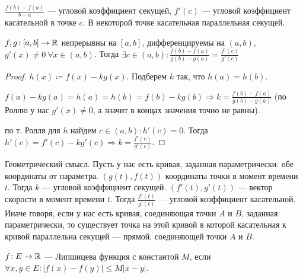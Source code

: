 \begin{remark}
    $\frac{f(b) - f(a)}{b - a}$ --- угловой коэффициент секущей, $f'(c)$ --- угловой коэффициент касательной в точке  $c$. В некоторой точке касательная параллельная секущей. 
\end{remark}
\begin{theorem}
    $f, g\!:[a, b] \to \mathbb{R}$ непрерывны на  $[a, b]$, дифференцируемы на  $(a, b)$,  $g'(x) \neq 0\ \forall x\in(a, b)$. Тогда $\exists c \in (a, b)\!: \frac{f(b) - f(a)}{g(b) - g(a)} = \frac{f'(c)}{g'(c)}$
\end{theorem}
\begin{proof}
    $h(x) \coloneqq f(x) - kg(x)$. Подберем $k$ так, что  $h(a) = h(b)$.

    $f(a) - kg(a) = h(a) = h(b) = f(b) - kg(b) \Rightarrow k = \frac{f(b) - f(a)}{g(b) - g(a)}$ (по Роллю у нас $g'(x) \neq 0$, а значит в концах значения точно не равны).

    по т. Ролля для $h$ найдем  $c \in (a, b)\!: h'(c) = 0$. Тогда  $h'(c) = f'(c) - kg'(c) \Rightarrow k = \frac{f'(c)}{g'(c)}$.
\end{proof}
\begin{remark}
	Геометрический смысл. Пусть у нас есть кривая, заданная параметрически: обе координаты от параметра. $(g(t), f(t))$ координаты точки в момент времени $t$. Тогда  $k$ --- угловой коэффициент секущей. $(f'(t), g'(t))$ --- вектор скорости в момент времени $t$. Тогда $\frac{f'(t)}{g'(t)}$ --- угловой коэффициент касательной. Иначе говоря, если у нас есть кривая, соединяющая точки $A$ и $B$, заданная параметрически, то существует точка на этой кривой в которой касательная к кривой параллельна секущей --- прямой, соединяющей точки $A$ и $B$.
\end{remark}
\begin{definition}
    $f\!:E\to \mathbb{R}$ --- Липшицева функция с константой $M$, если  $\forall x, y \in E\!: |f(x) - f(y)| \le M|x-y|$.
\end{definition}
